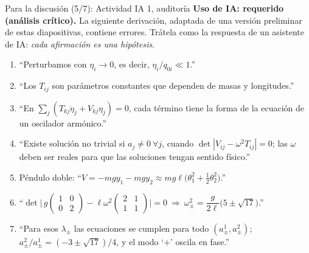 \documentclass[spanish]{beamer}
\newcommand{\IA}[1]{\textcolor{blue!60!black}{\textbf{#1}}}
\begin{document}
\begin{frame}{Para la discusión (5/7): Actividad IA 1, auditoría}
\IA{Uso de IA: requerido (análisis crítico).} La siguiente derivación, adaptada de una versión preliminar de estas diapositivas, contiene errores. Trátela como la respuesta de un asistente de IA: \emph{cada afirmación es una hipótesis}.
\small
\begin{enumerate}
\item[E1] ``Perturbamos con $\eta_i\to0$, es decir, $\eta_i/q_{0i}\ll1$.''
\item[E2] ``Los $T_{ij}$ son parámetros constantes que dependen de masas y longitudes.''
\item[E3] ``En $\sum_j(T_{kj}\ddot\eta_j+V_{kj}\eta_j)=0$, cada término tiene la forma de la ecuación de un oscilador armónico.''
\item[E4] ``Existe solución no trivial si $a_j\neq0\ \forall j$, cuando $\det|V_{ij}-\omega^2T_{ij}|=0$; las $\omega$ deben ser reales para que las soluciones tengan sentido físico.''
\item[E5] Péndulo doble: ``$V=-mgy_1-mgy_2\approx mg\ell\big(\theta_1^2+\tfrac12\theta_2^2\big)$.''
\item[E6] ``$\det\Big|\,g\begin{pmatrix}1&0\\0&2\end{pmatrix}-\ell\omega^2\begin{pmatrix}2&1\\1&1\end{pmatrix}\Big|=0\ \Rightarrow\ \omega_\pm^2=\dfrac{g}{2\ell}\big(5\pm\sqrt{17}\big)$.''
\item[E7] ``Para esos $\lambda_\pm$ las ecuaciones se cumplen para todo $(a^1_\pm,a^2_\pm)$; \ $a^2_\pm/a^1_\pm=(-3\pm\sqrt{17})/4$, y el modo `$+$' oscila en fase.''
\end{enumerate}
\end{frame}
\end{document}
